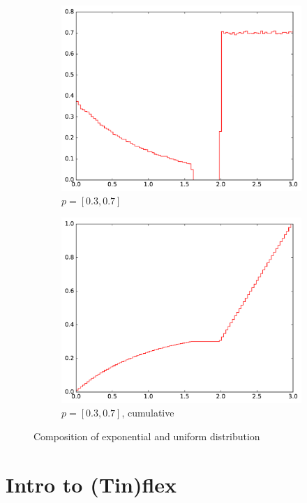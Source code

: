 \documentclass[]{article}
\begin{document}
\begin{figure}
\begin{subfigure}[b]{0.49\textwidth}
        \includegraphics[width=\textwidth]{figs/composed_dist_30_70.pdf}
        \caption{$p = [0.3, 0.7]$}
    \end{subfigure}
    \begin{subfigure}[b]{0.49\textwidth}
        \includegraphics[width=\textwidth]{figs/composed_dist_30_70_cum.pdf}
        \caption{$p = [0.3, 0.7]$, cumulative}
    \end{subfigure}
    \caption{Composition of exponential and uniform distribution}
     \label{fig:composition_exp_uniform}
\end{figure}

\section{Intro to (Tin)flex}
\end{document}
